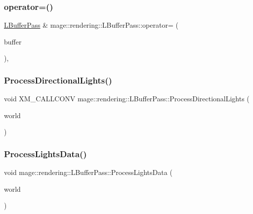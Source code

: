 \subsubsection{\texorpdfstring{operator=()}{operator=()}\hspace{0.1cm}{\footnotesize\ttfamily [2/2]}}
{\footnotesize\ttfamily \mbox{\hyperlink{classmage_1_1rendering_1_1_l_buffer_pass}{L\+Buffer\+Pass}} \& mage\+::rendering\+::\+L\+Buffer\+Pass\+::operator= (\begin{DoxyParamCaption}\item[{\mbox{\hyperlink{classmage_1_1rendering_1_1_l_buffer_pass}{L\+Buffer\+Pass}} \&\&}]{buffer }\end{DoxyParamCaption})\hspace{0.3cm}{\ttfamily [default]}, {\ttfamily [noexcept]}}

\mbox{\label{classmage_1_1rendering_1_1_l_buffer_pass_a97047b8acf6e4e552ab8f7b7ec08b1be}} 
\subsubsection{\texorpdfstring{Process\+Directional\+Lights()}{ProcessDirectionalLights()}}
{\footnotesize\ttfamily void X\+M\+\_\+\+C\+A\+L\+L\+C\+O\+NV mage\+::rendering\+::\+L\+Buffer\+Pass\+::\+Process\+Directional\+Lights (\begin{DoxyParamCaption}\item[{const \mbox{\hyperlink{classmage_1_1rendering_1_1_world}{World}} \&}]{world }\end{DoxyParamCaption})\hspace{0.3cm}{\ttfamily [private]}}

\mbox{\label{classmage_1_1rendering_1_1_l_buffer_pass_a1ec1d116e0b9ec1066faa7a2b3db5ca5}} 
\subsubsection{\texorpdfstring{Process\+Lights\+Data()}{ProcessLightsData()}}
{\footnotesize\ttfamily void mage\+::rendering\+::\+L\+Buffer\+Pass\+::\+Process\+Lights\+Data (\begin{DoxyParamCaption}\item[{const \mbox{\hyperlink{classmage_1_1rendering_1_1_world}{World}} \&}]{world }\end{DoxyParamCaption})\hspace{0.3cm}{\ttfamily [private]}}

